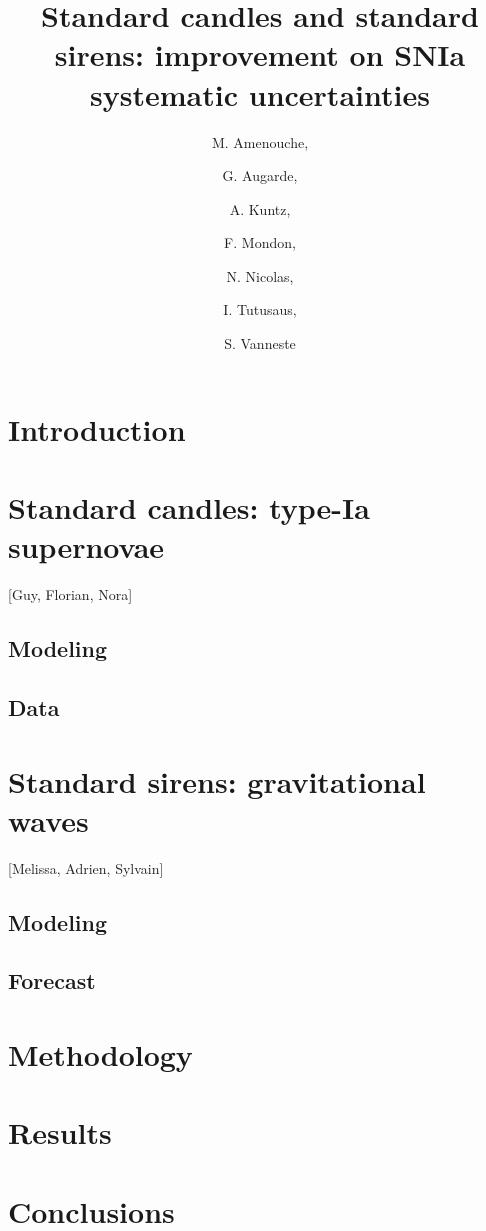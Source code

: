\documentclass[a4paper,11pt]{article}
\title{\boldmath Standard candles and standard sirens: improvement on SNIa systematic uncertainties}
\author[a]{M. Amenouche,}
\author[b]{G. Augarde,}
\author[c]{A. Kuntz,}
\author[d]{F. Mondon,}
\author[e]{N. Nicolas,}
\author[f]{I. Tutusaus,}
\author[g]{S. Vanneste}
\affiliation[a]{One University,\\some-street, Country}
\begin{document}
\maketitle
\flushbottom

\section{Introduction}
\label{sec:intro}


\section{Standard candles: type-Ia supernovae}
[Guy, Florian, Nora]

\subsection{Modeling}

\subsection{Data}


\section{Standard sirens: gravitational waves}
[Melissa, Adrien, Sylvain]

\subsection{Modeling}

\subsection{Forecast}

\section{Methodology}

\section{Results}

\section{Conclusions}

\end{document}
